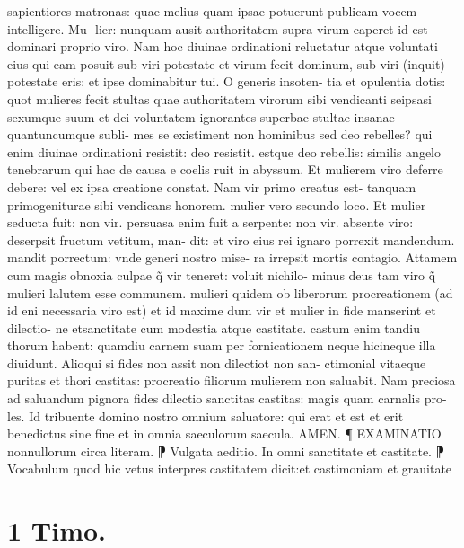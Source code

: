 \documentclass{article}
\begin{document}
\begin{pages}
sapientiores matronas: quae melius quam ipsae potuerunt publicam vocem intelligere. Mu- lier: nunquam ausit authoritatem supra virum caperet id est dominari proprio viro. Nam hoc diuinae ordinationi reluctatur  atque  voluntati eius qui eam posuit sub viri potestate et virum fecit dominum, sub viri (inquit) potestate eris: et ipse dominabitur tui. O generis insoten- tia et opulentia dotis: quot mulieres fecit stultas quae authoritatem virorum sibi vendicanti seipsasi sexumque  suum  et dei voluntatem ignorantes  superbae  stultae  insanae  quantuncumque  subli- mes se existiment non hominibus sed deo rebelles? qui enim diuinae ordinationi resistit: deo resistit. estque  deo rebellis: similis angelo tenebrarum qui hac de causa e coelis ruit in abyssum. Et mulierem viro deferre debere: vel ex ipsa creatione constat. Nam vir primo creatus est- tanquam primogeniturae sibi vendicans honorem. mulier vero secundo loco. Et mulier seducta fuit: non vir. persuasa enim fuit a serpente: non vir. absente viro: deserpsit fructum vetitum, man- dit: et viro eius rei ignaro porrexit mandendum. mandit porrectum: vnde generi nostro mise- ra irrepsit mortis contagio. Attamem cum magis obnoxia culpae q̃ vir teneret: voluit nichilo- minus deus tam viro q̃ mulieri lalutem esse communem. mulieri quidem ob liberorum procreationem (ad id eni necessaria viro est) et id maxime dum vir et mulier in fide manserint et dilectio- ne etsanctitate cum modestia atque  castitate. castum enim tandiu thorum habent: quamdiu carnem suam per fornicationem neque  hicineque  illa diuidunt. Alioqui si fides non assit non dilectiot non san- ctimonial vitaeque  puritas et thori castitas: procreatio filiorum mulierem non saluabit. Nam preciosa ad saluandum pignora fides dilectio  sanctitas castitas: magis quam carnalis pro- les. Id tribuente domino nostro omnium saluatore: qui erat  et est et erit benedictus sine fine et in omnia saeculorum saecula. AMEN.  \pend\pstart   ¶ EXAMINATIO nonnullorum circa literam. ⁋ Vulgata aeditio. In omni sanctitate et   castitate. ⁋ Vocabulum quod  hic vetus interpres castitatem dicit:et castimoniam et grauitate  \pend
\section*{1 Timo. }

\end{pages}
\end{document}
